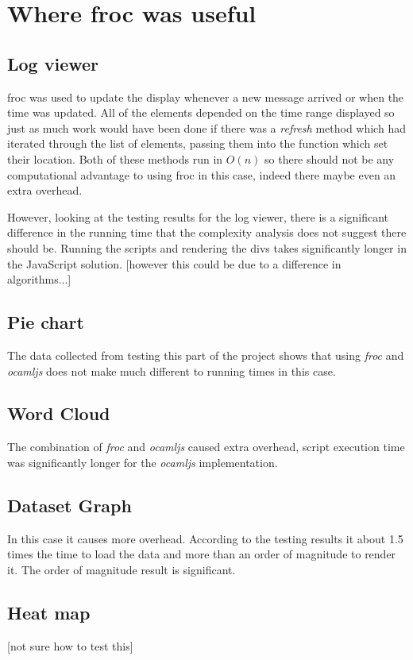 


\section{Where froc was useful}
\subsection{Log viewer}
froc was used to update the display whenever a new message arrived or when the time was updated. All of the elements depended on the time range displayed so just as much work would have been done if there was a \emph{refresh} method which had iterated through the list of elements, passing them into the function which set their location. Both of these methods run in $O(n)$ so there should not be any computational advantage to using froc in this case, indeed there maybe even an extra overhead.

However, looking at the testing results for the log viewer, there is a significant difference in the running time that the complexity analysis does not suggest there should be. Running the scripts and rendering the divs takes significantly longer in the JavaScript solution. [however this could be due to a difference in algorithms...]
\subsection{Pie chart}
The data collected from testing this part of the project shows that using \emph{froc} and \emph{ocamljs} does not make much different to running times in this case.
\subsection{Word Cloud}
The combination of \emph{froc} and \emph{ocamljs} caused extra overhead, script execution time was significantly longer for the \emph{ocamljs} implementation.
\subsection{Dataset Graph}
In this case it causes more overhead. According to the testing results it about 1.5 times the time to load the data and more than an order of magnitude to render it. The order of magnitude result is significant.
\subsection{Heat map}
[not sure how to test this]
